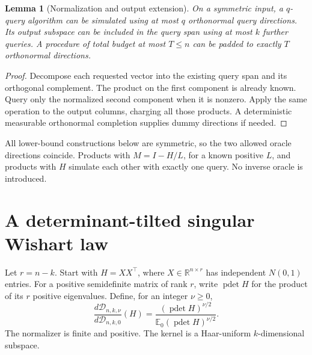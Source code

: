 \documentclass[11pt]{article}
\numberwithin{equation}{section}
\newtheorem{lemma}[theorem]{Lemma}
\theoremstyle{remark}\newtheorem{remark}[theorem]{Remark}
\newcommand{\R}{\mathbb R}
\newcommand{\E}{\mathbb E}
\newcommand{\pdet}{\operatorname{pdet}}
\newcommand{\calD}{\mathcal D}
\begin{document}
\begin{lemma}[Normalization and output extension]\label{lem:normalize}
On a symmetric input, a $q$-query algorithm can be simulated using at most $q$ orthonormal query directions. Its output subspace can be included in the query span using at most $k$ further queries. A procedure of total budget at most $T\le n$ can be padded to exactly $T$ orthonormal directions.
\end{lemma}
\begin{proof}
Decompose each requested vector into the existing query span and its orthogonal complement. The product on the first component is already known. Query only the normalized second component when it is nonzero. Apply the same operation to the output columns, charging all those products. A deterministic measurable orthonormal completion supplies dummy directions if needed.
\end{proof}
All lower-bound constructions below are symmetric, so the two allowed oracle directions coincide. Products with $M=I-H/L$, for a known positive $L$, and products with $H$ simulate each other with exactly one query. No inverse oracle is introduced.

\section{A determinant-tilted singular Wishart law}\label{sec:prior}
Let $r=n-k$. Start with $H=XX^\top$, where $X\in\R^{n\times r}$ has independent $N(0,1)$ entries. For a positive semidefinite matrix of rank $r$, write $\pdet H$ for the product of its $r$ positive eigenvalues. Define, for an integer $\nu\ge0$,
\begin{equation}\label{eq:tilt}
\frac{d\calD_{n,k,\nu}}{d\calD_{n,k,0}}(H)
=\frac{(\pdet H)^{\nu/2}}{\E_0(\pdet H)^{\nu/2}}.
\end{equation}
The normalizer is finite and positive. The kernel is a Haar-uniform $k$-dimensional subspace.
\end{document}
